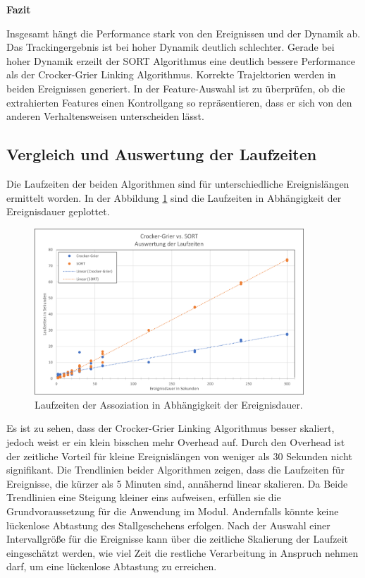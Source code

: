\par
\textbf{Fazit}\par
Insgesamt hängt die Performance stark von den Ereignissen und der Dynamik ab. Das Trackingergebnis ist bei hoher Dynamik deutlich schlechter. Gerade bei hoher Dynamik erzeilt der SORT Algorithmus eine deutlich bessere Performance als der Crocker-Grier Linking Algorithmus. Korrekte Trajektorien werden in beiden Ereignissen generiert. In der Feature-Auswahl ist zu überprüfen, ob die extrahierten Features einen Kontrollgang so repräsentieren, dass er sich von den anderen Verhaltensweisen unterscheiden lässt.


\subsection{Vergleich und Auswertung der Laufzeiten}
Die Laufzeiten der beiden Algorithmen sind für unterschiedliche Ereignislängen ermittelt worden. In der Abbildung \ref{fig:plotRunTMOT} sind die Laufzeiten in Abhängigkeit der Ereignisdauer geplottet.

\begin{figure}[htb]
    \centering
    \includegraphics[width=0.9\textwidth]{img/Plots/MOT Evaluation/Assoziationsalgorithmen Laufzeiten.png}  
    \caption{Laufzeiten der Assoziation in Abhängigkeit der Ereignisdauer.}
    \label{fig:plotRunTMOT}
\end{figure}

Es ist zu sehen, dass der Crocker-Grier Linking Algorithmus besser skaliert, jedoch weist er ein klein bisschen mehr Overhead auf. Durch den Overhead ist der zeitliche Vorteil für kleine Ereignislängen von weniger als 30 Sekunden nicht signifikant. Die Trendlinien beider Algorithmen zeigen, dass die Laufzeiten für Ereignisse, die kürzer als 5 Minuten sind, annähernd linear skalieren. Da Beide Trendlinien eine Steigung kleiner eins aufweisen, erfüllen sie die Grundvoraussetzung für die Anwendung im Modul. Andernfalls könnte keine lückenlose Abtastung des Stallgeschehens erfolgen. Nach der Auswahl einer Intervallgröße für die Ereignisse kann über die zeitliche Skalierung der Laufzeit eingeschätzt werden, wie viel Zeit die restliche Verarbeitung in Anspruch nehmen darf, um eine lückenlose Abtastung zu erreichen.  \dubpar

